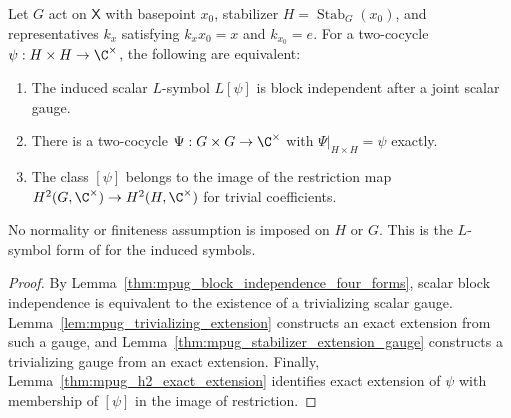 \begin{lemma}
    \label{lem:mpug_scalar_bi_restriction}
    \leanok
    Let $G$ act on $\mathsf X$ with basepoint $x_0$, stabilizer
    $H=\operatorname{Stab}_G(x_0)$, and representatives $k_x$ satisfying
    $k_xx_0=x$ and $k_{x_0}=e$. For a two-cocycle
    $\psi:H\times H\to\C^\times$, the following are equivalent:
    \begin{enumerate}
        \item The induced scalar $L$-symbol $L[\psi]$ is block independent
              after a joint scalar gauge.
        \item There is a two-cocycle $\Psi:G\times G\to\C^\times$ with
              $\Psi|_{H\times H}=\psi$ exactly.
        \item The class $[\psi]$ belongs to the image of the restriction map
              $H^2(G,\C^\times)\to H^2(H,\C^\times)$ for trivial coefficients.
    \end{enumerate}
    No normality or finiteness assumption is imposed on $H$ or $G$.
    This is the $L$-symbol form of
    \cite[lines~7042--7064]{FrancoRubio2025MPUGauging} for the induced symbols.
\end{lemma}
\begin{proof}\leanok
    By Lemma~\ref{thm:mpug_block_independence_four_forms}, scalar block
    independence is equivalent to the existence of a trivializing scalar
    gauge. Lemma~\ref{lem:mpug_trivializing_extension} constructs an exact
    extension from such a gauge, and
    Lemma~\ref{thm:mpug_stabilizer_extension_gauge} constructs a trivializing
    gauge from an exact extension. Finally,
    Lemma~\ref{thm:mpug_h2_exact_extension} identifies exact extension of
    $\psi$ with membership of $[\psi]$ in the image of restriction.
\end{proof}

